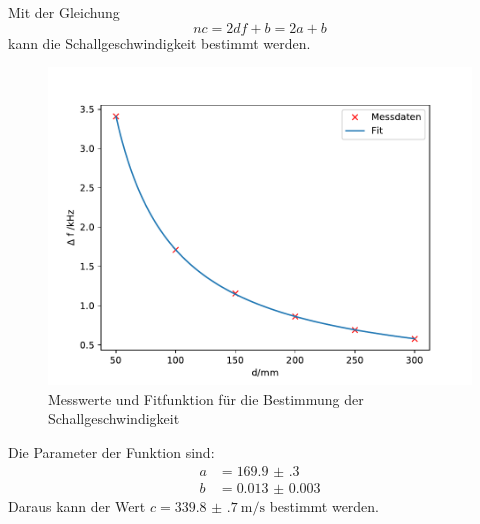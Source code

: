 Mit der Gleichung 
\begin{equation*}
    nc = 2df +b =2a+b
\end{equation*}
kann die Schallgeschwindigkeit bestimmt werden.
\FloatBarrier
\begin{figure}
    \caption{Messwerte und Fitfunktion für die Bestimmung der Schallgeschwindigkeit}
\includegraphics[width = \textwidth]{figure/Schallgeschwindigkeit.pdf}
\end{figure}
\FloatBarrier
Die Parameter der Funktion sind:
\begin{align*}
    a&= \num{169.9(3)}\\
    b&= \num{0.013(3)}
\end{align*}
Daraus kann der Wert $c=\SI{339.8(7)}{\meter\per\second}$ bestimmt werden.

